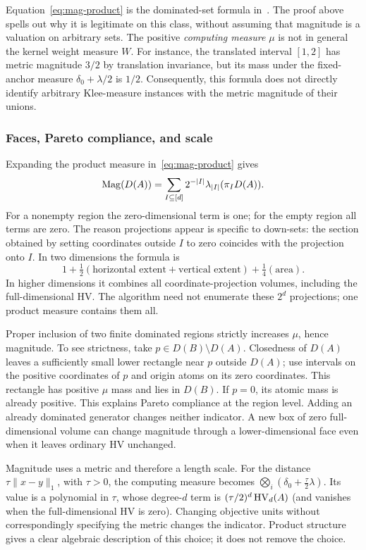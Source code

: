 Equation~\eqref{eq:mag-product} is the dominated-set formula
in~\cite{emmerich2026}. The proof above spells out why it is legitimate
on this class, without assuming that magnitude is a valuation on arbitrary
sets. The positive \emph{computing measure} $\mu$ is not in general the
kernel weight measure $W$. For instance, the translated interval $[1,2]$
has metric magnitude $3/2$ by translation invariance, but its mass under
the fixed-anchor measure $\delta_0+\lambda/2$ is $1/2$. Consequently,
this formula does not directly identify arbitrary Klee-measure instances
with the metric magnitude of their unions.

\subsubsection{Faces, Pareto compliance, and scale}
Expanding the product measure in~\eqref{eq:mag-product} gives
\begin{equation}
 \operatorname{Mag}(D(A))=\sum_{I\subseteq[d]}2^{-|I|}
                       \lambda_{|I|}(\pi_I D(A)).
 \label{eq:projection}
\end{equation}
For a nonempty region the zero-dimensional term is one; for the empty
region all terms are zero. The reason projections appear is specific to
down-sets: the section obtained by setting coordinates outside $I$ to
zero coincides with the projection onto $I$.
In two dimensions the formula is
\[
 1+\tfrac12(\text{horizontal extent}+\text{vertical extent})
                      +\tfrac14(\text{area}).
\]
In higher dimensions it combines all coordinate-projection volumes,
including the full-dimensional HV. The algorithm need not enumerate
these $2^d$ projections; one product measure contains them all.

Proper inclusion of two finite dominated regions strictly increases
$\mu$, hence magnitude. To see strictness, take $p\in D(B)\setminus D(A)$.
Closedness of $D(A)$ leaves a sufficiently small lower rectangle near $p$
outside $D(A)$; use intervals on the positive coordinates of $p$ and
origin atoms on its zero coordinates. This rectangle has positive $\mu$
mass and lies in $D(B)$. If $p=0$, its atomic mass is already positive.
This explains Pareto compliance at the region level. Adding an already
dominated generator changes neither indicator. A new box of zero
full-dimensional volume can change magnitude through a lower-dimensional
face even when it leaves ordinary HV unchanged.

Magnitude uses a metric and therefore a length scale. For the distance
$\tau\|x-y\|_1$, with $\tau>0$, the computing measure becomes
$\bigotimes_i(\delta_0+\tfrac\tau2\lambda)$. Its value is a polynomial
in $\tau$, whose degree-$d$ term is $(\tau/2)^d\operatorname{HV}_d(A)$
(and vanishes when the full-dimensional HV is zero).
Changing objective units without correspondingly specifying the metric
changes the indicator. Product structure gives a clear algebraic
description of this choice; it does not remove the choice.

